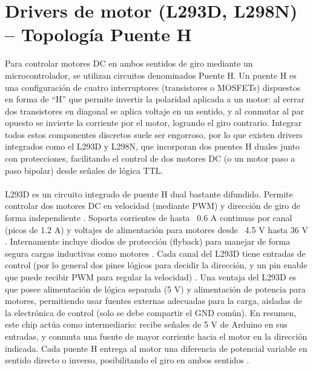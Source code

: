 \section{Drivers de motor (L293D, L298N) – Topología Puente H}
Para controlar motores DC en ambos sentidos de giro mediante un microcontrolador, se utilizan circuitos denominados Puente H. Un puente H es una configuración de cuatro interruptores (transistores o MOSFETs) dispuestos en forma de “H” que permite invertir la polaridad aplicada a un motor: al cerrar dos transistores en diagonal se aplica voltaje en un sentido, y al conmutar al par opuesto se invierte la corriente por el motor, logrando el giro contrario. Integrar todos estos componentes discretos suele ser engorroso, por lo que existen drivers integrados como el L293D y L298N, que incorporan dos puentes H duales junto con protecciones, facilitando el control de dos motores DC (o un motor paso a paso bipolar) desde señales de lógica TTL. 
\\\\
L293D es un circuito integrado de puente H dual bastante difundido. Permite controlar dos motores DC en velocidad (mediante PWM) y dirección de giro de forma independiente \cite{Actuadores-1}. Soporta corrientes de hasta ~0.6 A continuas por canal (picos de 1.2 A) y voltajes de alimentación para motores desde ~4.5 V hasta 36 V \cite{Actuadores-1}. Internamente incluye diodos de protección (flyback) para manejar de forma segura cargas inductivas como motores \cite{Actuadores-1}. Cada canal del L293D tiene entradas de control (por lo general dos pines lógicos para decidir la dirección, y un pin enable que puede recibir PWM para regular la velocidad) \cite{Actuadores-1} \cite{Actuadores-2}. Una ventaja del L293D es que posee alimentación de lógica separada (5 V) y alimentación de potencia para motores, permitiendo usar fuentes externas adecuadas para la carga, aisladas de la electrónica de control (solo se debe compartir el GND común). En resumen, este chip actúa como intermediario: recibe señales de 5 V de Arduino en sus entradas, y conmuta una fuente de mayor corriente hacia el motor en la dirección indicada. Cada puente H entrega al motor una diferencia de potencial variable en sentido directo o inverso, posibilitando el giro en ambos sentidos \cite{Actuadores-1}. 
\\\\
